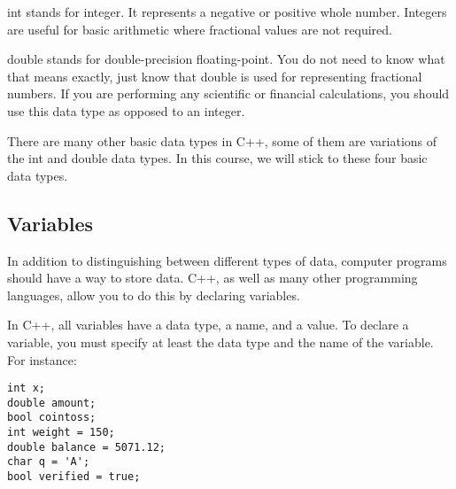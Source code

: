 \documentclass[a4paper,12pt]{article}
\begin{document}
int stands for integer. It represents a negative or positive whole number. Integers are useful for basic arithmetic where fractional values are not required. 

double stands for double-precision floating-point. You do not need to know what that means exactly, just know that double is used for representing fractional numbers. If you are performing any scientific or financial calculations, you should use this data type as opposed to an integer. 

There are many other basic data types in C++, some of them are variations of the int and double data types. In this course, we will stick to these four basic data types.

\subsection*{Variables}

In addition to distinguishing between different types of data, computer programs should have a way to store data. C++, as well as many other programming languages, allow you to do this by declaring variables.

In C++, all variables have a data type, a name, and a value. To declare a variable, you must specify at least the data type and the name of the variable. For instance:

\begin{lstlisting}[caption=A series of variable declarations in C++]
int x;
double amount;
bool cointoss;
int weight = 150;
double balance = 5071.12;
char q = 'A';
bool verified = true;
\end{lstlisting}
\end{document}
